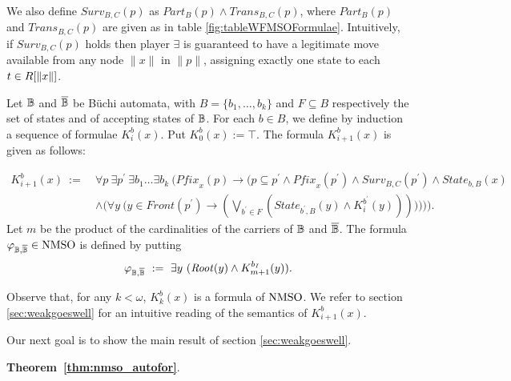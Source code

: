 \begin{definition}
We also define $\mathit{Surv}_{B,C}(p)$ as $\mathit{Part}_B(p) \wedge \mathit{Trans}_{B,C}(p)$, where $\mathit{Part}_B(p)$ and $\mathit{Trans}_{B,C}(p)$ are given as in table \ref{fig:tableWFMSOFormulae}. Intuitively, if $\mathit{Surv}_{B,C}(p)$ holds then player $\exists$ is guaranteed to have a legitimate move available from any node $\|x\|$ in $\|p\|$, assigning exactly one state to each $t \in R[\|x\|]$.
\end{definition}


\begin{definition}\label{DEF_K_m} Let $\mathbb{B}$ and $\overline{\mathbb{B}}$ be B\"{u}chi automata, with $B = \{b_1,\dots,b_k\}$ and $F\subseteq B$ respectively the set of states and of accepting states of $\mathbb{B}$. For each $b \in B$, we define by induction a sequence of formulae $K_i^b(x)$. Put $K_0^{b}(x) := \top$. The formula $K_{i+1}^{b}(x)$ is given as follows:

\begin{align*}
  K_{i+1}^{b}(x)\ :=\ & \forall p\ \exists p^{\prime}\ \exists b_1\dots\exists b_k\ \Bigg(\mathit{Pfix}_x(p) \rightarrow
                       \bigg(p \subseteq p^{\prime} \wedge \mathit{Pfix}_x(p^{\prime}) \wedge \mathit{Surv}_{B,C}(p^{\prime}) \wedge
                       \mathit{State}_{b,B}(x)  \\
                       & \wedge \Big(\forall y\ \big(y\in \mathit{Front}(p^{\prime})\rightarrow 
                       (\bigvee_{b^{\prime} \in F} (\mathit{State}_{b^{\prime},B}(y) \wedge K_i^{b^{\prime}}(y)))\big)\Big)\bigg)\Bigg).
\end{align*}
Let $m$ be the product of the cardinalities of the carriers of $\mathbb{B}$ and $\overline{\mathbb{B}}$. The formula $\varphi_{\mathbb{B},\overline{\mathbb{B}}} \in \mathrm{NMSO}$ is defined by putting
\begin{equation*}
    \varphi_{\baut,\overline{\baut}}\ :=\ \exists y\ (\mathit{Root}(y) \wedge K_{m+1}^{b_I}(y)).
\end{equation*}
\end{definition}

Observe that, for any $k < \omega$, $K_k^b(x)$ is a formula of $\mathrm{NMSO}$. We refer to section \ref{sec:weakgoeswell} for an intuitive reading of the semantics of $K_{i+1}^{b}(x)$.

Our next goal is to show the main result of section \ref{sec:weakgoeswell}.

\begin{trivlist}
\item \textbf{Theorem~\ref{thm:nmso_autofor}}. \ThWeakAutToWFMSO
\end{trivlist}

